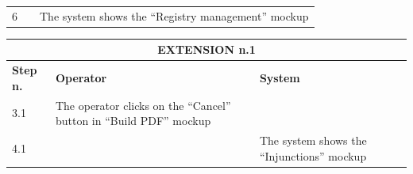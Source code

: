 {{{\begin{center}
\begin{tabular}{|p{2cm}|p{6cm}|p{6cm}|}
				\vspace{1mm} \vspace{1mm} \\
			\hline
				\vspace{1mm} 6\vspace{1mm} &
				\vspace{1mm} \vspace{1mm} & 
				\vspace{1mm} The system shows the “Registry management” mockup\vspace{1mm} \\
			\hline
			\end{tabular}

			\begin{tabular}{|p{2cm}|p{6cm}|p{6cm}|}
			\hline
				\multicolumn{3}{|c|}{EXTENSION n.1}\\
			\hline
				\centering \vspace{1mm} \bfseries{Step n.} \vspace{1mm} & \vspace{1mm} \bfseries{Operator} \vspace{1mm} & \vspace{1mm} \bfseries{System} \vspace{1mm}\\
			\hline
				\vspace{1mm} 3.1\vspace{1mm} &
				\vspace{1mm} The operator clicks on the “Cancel” button in “Build PDF” mockup \vspace{1mm} & 
				\vspace{1mm} \vspace{1mm} \\
			\hline
				\vspace{1mm} 4.1\vspace{1mm} &
				\vspace{1mm} \vspace{1mm} & 
				\vspace{1mm} The system shows the “Injunctions” mockup\vspace{1mm} \\
			\hline
			\end{tabular}


\end{center}}}}
